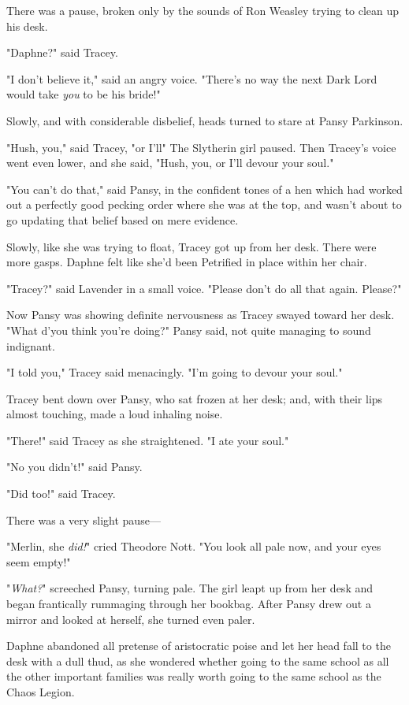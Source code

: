 There was a pause, broken only by the sounds of Ron Weasley trying to clean up
his desk.

"Daphne?" said Tracey.

"I don't believe it," said an angry voice. "There's no way the next Dark Lord
would take \emph{you} to be his bride!"

Slowly, and with considerable disbelief, heads turned to stare at Pansy
Parkinson.

"Hush, you," said Tracey, "or I'll{\el}" The Slytherin girl paused. Then
Tracey's voice went even lower, and she said, "Hush, you, or I'll devour your
soul."

"You can't do that," said Pansy, in the confident tones of a hen which had
worked out a perfectly good pecking order where she was at the top, and wasn't
about to go updating that belief based on mere evidence.

Slowly, like she was trying to float, Tracey got up from her desk. There were
more gasps. Daphne felt like she'd been Petrified in place within her chair.

"Tracey?" said Lavender in a small voice. "Please don't do all that again.
Please?"

Now Pansy was showing definite nervousness as Tracey swayed toward her desk.
"What d'you think you're doing?" Pansy said, not quite managing to sound
indignant.

"I told you," Tracey said menacingly. "I'm going to devour your soul."

Tracey bent down over Pansy, who sat frozen at her desk; and, with their lips
almost touching, made a loud inhaling noise.

"There!" said Tracey as she straightened. "I ate your soul."

"No you didn't!" said Pansy.

"Did too!" said Tracey.

There was a very slight pause—

"Merlin, she \emph{did!}" cried Theodore Nott. "You look all pale now, and your
eyes seem empty!"

"\emph{What?}" screeched Pansy, turning pale. The girl leapt up from her desk
and began frantically rummaging through her bookbag. After Pansy drew out a
mirror and looked at herself, she turned even paler.

Daphne abandoned all pretense of aristocratic poise and let her head fall to
the desk with a dull thud, as she wondered whether going to the same school as
all the other important families was really worth going to the same school as
the Chaos Legion.

